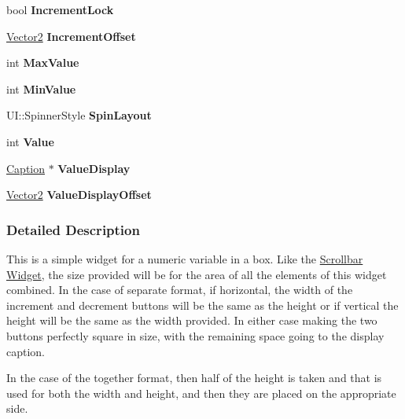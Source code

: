 \begin{DoxyCompactItemize}
\item 
\hypertarget{classphys_1_1UI_1_1Spinner_adb04a25026f70dbcaba9d7380ac87569}{
bool {\bfseries IncrementLock}}
\label{classphys_1_1UI_1_1Spinner_adb04a25026f70dbcaba9d7380ac87569}

\item 
\hypertarget{classphys_1_1UI_1_1Spinner_ad023b770c4ef4fff72ebae0e5d29836a}{
\hyperlink{classphys_1_1Vector2}{Vector2} {\bfseries IncrementOffset}}
\label{classphys_1_1UI_1_1Spinner_ad023b770c4ef4fff72ebae0e5d29836a}

\item 
\hypertarget{classphys_1_1UI_1_1Spinner_a36629c08efd1cd554ae91d2b73e5791a}{
int {\bfseries MaxValue}}
\label{classphys_1_1UI_1_1Spinner_a36629c08efd1cd554ae91d2b73e5791a}

\item 
\hypertarget{classphys_1_1UI_1_1Spinner_a615c7f96fd2267247a7537043d521a08}{
int {\bfseries MinValue}}
\label{classphys_1_1UI_1_1Spinner_a615c7f96fd2267247a7537043d521a08}

\item 
\hypertarget{classphys_1_1UI_1_1Spinner_a9e46f97ce5d56a7595ee49071dcf29bc}{
UI::SpinnerStyle {\bfseries SpinLayout}}
\label{classphys_1_1UI_1_1Spinner_a9e46f97ce5d56a7595ee49071dcf29bc}

\item 
\hypertarget{classphys_1_1UI_1_1Spinner_a6d7fcdd0d6db3ea34f695cedba26dfc8}{
int {\bfseries Value}}
\label{classphys_1_1UI_1_1Spinner_a6d7fcdd0d6db3ea34f695cedba26dfc8}

\item 
\hypertarget{classphys_1_1UI_1_1Spinner_ac4bc2bfd4686babfabf98cc8789c4a90}{
\hyperlink{classphys_1_1UI_1_1Caption}{Caption} $\ast$ {\bfseries ValueDisplay}}
\label{classphys_1_1UI_1_1Spinner_ac4bc2bfd4686babfabf98cc8789c4a90}

\item 
\hypertarget{classphys_1_1UI_1_1Spinner_a528269192dd2e2b85b31c8aa8b0552c8}{
\hyperlink{classphys_1_1Vector2}{Vector2} {\bfseries ValueDisplayOffset}}
\label{classphys_1_1UI_1_1Spinner_a528269192dd2e2b85b31c8aa8b0552c8}

\end{DoxyCompactItemize}


\subsubsection{Detailed Description}
This is a simple widget for a numeric variable in a box. Like the \hyperlink{classphys_1_1UI_1_1Scrollbar}{Scrollbar} \hyperlink{classphys_1_1UI_1_1Widget}{Widget}, the size provided will be for the area of all the elements of this widget combined. In the case of separate format, if horizontal, the width of the increment and decrement buttons will be the same as the height or if vertical the height will be the same as the width provided. In either case making the two buttons perfectly square in size, with the remaining space going to the display caption. \par
 In the case of the together format, then half of the height is taken and that is used for both the width and height, and then they are placed on the appropriate side. 

